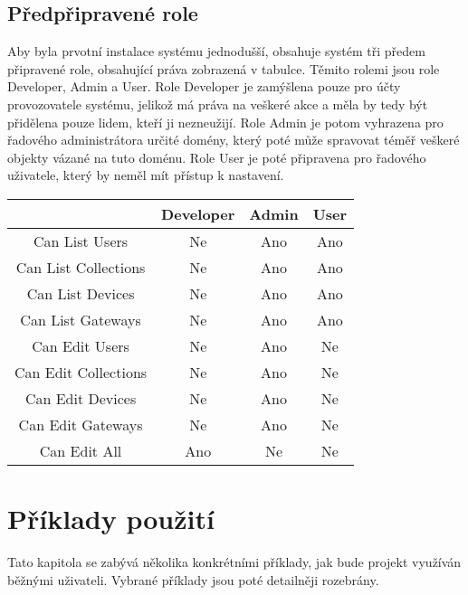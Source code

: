 \subsection{Předpřipravené role}

Aby byla prvotní instalace systému jednodušší, obsahuje systém tři předem připravené role, obsahující práva zobrazená v tabulce. Těmito rolemi jsou role Developer, Admin a User. Role Developer je zamýšlena pouze pro účty provozovatele systému, jelikož má práva na veškeré akce a měla by tedy být přidělena pouze lidem, kteří ji nezneužijí. Role Admin je potom vyhrazena pro řadového administrátora určité domény, který poté může spravovat téměř veškeré objekty vázané na tuto doménu. Role User je poté připravena pro řadového uživatele, který by neměl mít přístup k nastavení.

\begin{tabular}{|c|c|c|c|}
\hline
 & Developer & Admin & User \\ \hline
Can List Users & Ne & Ano & Ano \\ \hline
Can List Collections & Ne & Ano & Ano \\ \hline
Can List Devices & Ne & Ano & Ano \\ \hline
Can List Gateways & Ne & Ano & Ano \\ \hline
Can Edit Users & Ne & Ano & Ne \\ \hline
Can Edit Collections & Ne & Ano & Ne \\ \hline
Can Edit Devices & Ne & Ano & Ne \\ \hline
Can Edit Gateways & Ne & Ano & Ne \\ \hline
Can Edit All & Ano & Ne & Ne \\ \hline
\end{tabular}

\section{Příklady použití}
Tato kapitola se zabývá několika konkrétními příklady, jak bude projekt využíván běžnými uživateli. Vybrané příklady jsou poté detailněji rozebrány. 

